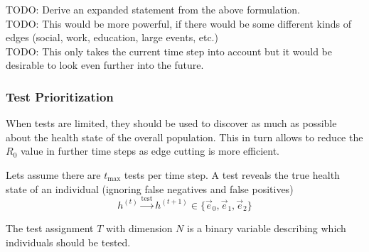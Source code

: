 \documentclass[]{article}
\begin{document}
TODO: Derive an expanded statement from the above formulation.\\
TODO: This would be more powerful, if there would be some different kinds of edges (social, work, education, large events, etc.)\\
TODO: This only takes the current time step into account but it would be desirable to look even further into the future.

\subsubsection{Test Prioritization}
When tests are limited, they should be used to discover as much as possible about the health state of the overall population.
This in turn allows to reduce the $R_0$ value in further time steps as edge cutting is more efficient.

Lets assume there are $t_{\text{max}}$ tests per time step.
A test reveals the true health state of an individual (ignoring false negatives and false positives)
\begin{equation}
	h^{(t)} \xrightarrow{\text{test}} h^{(t+1)} \in \{\vec{e}_0, \vec{e}_1, \vec{e}_2 \}
\end{equation}

The test assignment $T$ with dimension $N$ is a binary variable describing which individuals should be tested.
\end{document}
